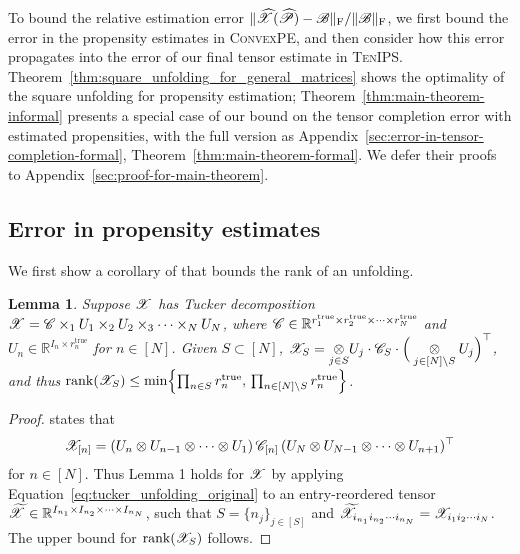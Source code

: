 \documentclass{article}
\newcommand{\T}[2][]{#1\mathscr{\MakeUppercase{#2}}}
\newcommand{\RR}{\mathbb{R}}
\newcommand{\norm}[1]{\Vert #1 \Vert}
\newcommand{\fnorm}[1]{\norm{#1}_{\mathrm{F}}}
\theoremstyle{plain}
\newtheorem{lemma}[theorem]{Lemma}
\begin{document}
To bound the relative estimation error $\fnorm{\widehat{\T{X}}(\widehat{\T{P}}) - \T{B}} / \fnorm{\T{B}}$,
we first bound the error in the propensity estimates in \textsc{ConvexPE},
and then consider how this error propagates into the error of our final tensor estimate in \textsc{TenIPS}.
Theorem~\ref{thm:square_unfolding_for_general_matrices} shows the optimality of the square unfolding for propensity estimation; Theorem~\ref{thm:main-theorem-informal} presents a special case of our bound on the tensor completion error with estimated propensities, with the full version as Appendix~\ref{sec:error-in-tensor-completion-formal}, Theorem~\ref{thm:main-theorem-formal}.
We defer their proofs to Appendix~\ref{sec:proof-for-main-theorem}.

\subsection{Error in propensity estimates}
\label{sec:propensity-estimation}
We first show a corollary of \cite[Lemma 6 (2) and Lemma 7]{mu2014square} that bounds the rank of an unfolding.
\begin{lemma}
	\label{lem:tucker_unfolding}
	Suppose $\T{X}$ has Tucker decomposition
	$\T{X}=\T{C}\times_1 U_1 \times_2 U_2 \times_3 \cdots \times_N U_N$,
	where $\T{C} \in \RR^{r_1^\mathrm{true} \times r_2^\mathrm{true} \times \cdots \times r_N^\mathrm{true}}$
	and $U_n \in \RR^{I_n \times r_n^\mathrm{true}}$ for $n \in [N]$.
	Given $S \subset [N]$, $\T{X}_S = \underset{j \in S}{\otimes} U_j \cdot \T{C}_S \cdot \Big(\underset{j \in [N] \backslash S}{\otimes} U_j\Big)^\top$, and thus $\mathrm{rank}( \T{X}_S) \leq \min \Bigl\{\prod_{n \in S} r_n^\mathrm{true}, \, \prod_{n \in [N] \backslash S} r_n^\mathrm{true} \Big\}$.
\end{lemma}

\begin{proof}
	\cite[Lemma 6 (2)]{mu2014square} states that
	\begin{equation}
		\label{eq:tucker_unfolding_original}
		\T{X}_{[n]} = (U_n \otimes U_{n-1} \otimes \cdots \otimes U_1) \,\T{C}_{[n]}\, (U_N \otimes U_{N-1} \otimes \cdots \otimes U_{n+1})^\top
	\end{equation}
	for $n \in [N]$.
	Thus Lemma 1 holds for $\T{X}$ by applying
	Equation~\ref{eq:tucker_unfolding_original} to an entry-reordered tensor
	$\widetilde{\T{X}} \in \RR^{I_{n_1} \times I_{n_2} \times \cdots \times I_{n_N}}$,
	such that $S = \{n_j\}_{j \in [S]}$ and $\widetilde{\T{X}}_{i_{n_1} i_{n_2} \cdots i_{n_N}} = \T{X}_{i_1 i_2 \cdots i_N}$.
	The upper bound for $\mathrm{rank}( \T{X}_S)$ follows.
\end{proof}
\end{document}
